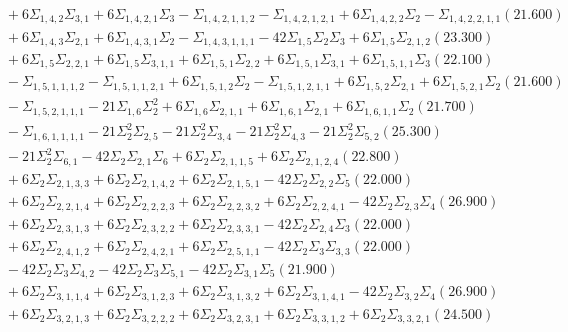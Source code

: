 \documentclass[12pt]{article}
\begin{document}
\begin{landscape}
\begin{align*}
		&\quad\quad +6\Sigma_{1,4,2}\Sigma_{3,1}+6\Sigma_{1,4,2,1}\Sigma_{3}-\Sigma_{1,4,2,1,1,2}-\Sigma_{1,4,2,1,2,1}+6\Sigma_{1,4,2,2}\Sigma_{2}-\Sigma_{1,4,2,2,1,1}(21.600) \\ 
		&\quad\quad +6\Sigma_{1,4,3}\Sigma_{2,1}+6\Sigma_{1,4,3,1}\Sigma_{2}-\Sigma_{1,4,3,1,1,1}-42\Sigma_{1,5}\Sigma_{2}\Sigma_{3}+6\Sigma_{1,5}\Sigma_{2,1,2}(23.300) \\ 
		&\quad\quad +6\Sigma_{1,5}\Sigma_{2,2,1}+6\Sigma_{1,5}\Sigma_{3,1,1}+6\Sigma_{1,5,1}\Sigma_{2,2}+6\Sigma_{1,5,1}\Sigma_{3,1}+6\Sigma_{1,5,1,1}\Sigma_{3}(22.100) \\ 
		&\quad\quad -\Sigma_{1,5,1,1,1,2}-\Sigma_{1,5,1,1,2,1}+6\Sigma_{1,5,1,2}\Sigma_{2}-\Sigma_{1,5,1,2,1,1}+6\Sigma_{1,5,2}\Sigma_{2,1}+6\Sigma_{1,5,2,1}\Sigma_{2}(21.600) \\ 
		&\quad\quad -\Sigma_{1,5,2,1,1,1}-21\Sigma_{1,6}\Sigma_{2}^{2}+6\Sigma_{1,6}\Sigma_{2,1,1}+6\Sigma_{1,6,1}\Sigma_{2,1}+6\Sigma_{1,6,1,1}\Sigma_{2}(21.700) \\ 
		&\quad\quad -\Sigma_{1,6,1,1,1,1}-21\Sigma_{2}^{2}\Sigma_{2,5}-21\Sigma_{2}^{2}\Sigma_{3,4}-21\Sigma_{2}^{2}\Sigma_{4,3}-21\Sigma_{2}^{2}\Sigma_{5,2}(25.300) \\ 
		&\quad\quad -21\Sigma_{2}^{2}\Sigma_{6,1}-42\Sigma_{2}\Sigma_{2,1}\Sigma_{6}+6\Sigma_{2}\Sigma_{2,1,1,5}+6\Sigma_{2}\Sigma_{2,1,2,4}(22.800) \\ 
		&\quad\quad +6\Sigma_{2}\Sigma_{2,1,3,3}+6\Sigma_{2}\Sigma_{2,1,4,2}+6\Sigma_{2}\Sigma_{2,1,5,1}-42\Sigma_{2}\Sigma_{2,2}\Sigma_{5}(22.000) \\ 
		&\quad\quad +6\Sigma_{2}\Sigma_{2,2,1,4}+6\Sigma_{2}\Sigma_{2,2,2,3}+6\Sigma_{2}\Sigma_{2,2,3,2}+6\Sigma_{2}\Sigma_{2,2,4,1}-42\Sigma_{2}\Sigma_{2,3}\Sigma_{4}(26.900) \\ 
		&\quad\quad +6\Sigma_{2}\Sigma_{2,3,1,3}+6\Sigma_{2}\Sigma_{2,3,2,2}+6\Sigma_{2}\Sigma_{2,3,3,1}-42\Sigma_{2}\Sigma_{2,4}\Sigma_{3}(22.000) \\ 
		&\quad\quad +6\Sigma_{2}\Sigma_{2,4,1,2}+6\Sigma_{2}\Sigma_{2,4,2,1}+6\Sigma_{2}\Sigma_{2,5,1,1}-42\Sigma_{2}\Sigma_{3}\Sigma_{3,3}(22.000) \\ 
		&\quad\quad -42\Sigma_{2}\Sigma_{3}\Sigma_{4,2}-42\Sigma_{2}\Sigma_{3}\Sigma_{5,1}-42\Sigma_{2}\Sigma_{3,1}\Sigma_{5}(21.900) \\ 
		&\quad\quad +6\Sigma_{2}\Sigma_{3,1,1,4}+6\Sigma_{2}\Sigma_{3,1,2,3}+6\Sigma_{2}\Sigma_{3,1,3,2}+6\Sigma_{2}\Sigma_{3,1,4,1}-42\Sigma_{2}\Sigma_{3,2}\Sigma_{4}(26.900) \\ 
		&\quad\quad +6\Sigma_{2}\Sigma_{3,2,1,3}+6\Sigma_{2}\Sigma_{3,2,2,2}+6\Sigma_{2}\Sigma_{3,2,3,1}+6\Sigma_{2}\Sigma_{3,3,1,2}+6\Sigma_{2}\Sigma_{3,3,2,1}(24.500) \\ 

\end{align*}
\end{landscape}
\end{document}
